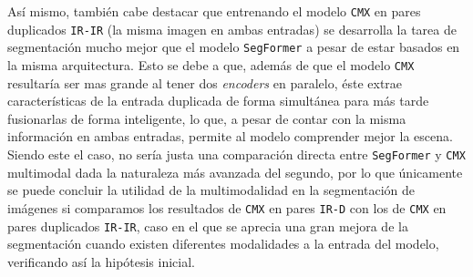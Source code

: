 \documentclass[12pt,a4paper]{report}
\begin{document}
Así mismo, también cabe destacar que entrenando el modelo \texttt{CMX} en pares duplicados \texttt{IR-IR} (la misma imagen en ambas entradas) se desarrolla la tarea de segmentación mucho mejor que el modelo \texttt{SegFormer} a pesar de estar basados en la misma arquitectura. Esto se debe a que, además de que el modelo \texttt{CMX} resultaría ser mas grande al tener dos \textit{encoders} en paralelo, éste extrae características de la entrada duplicada de forma simultánea para más tarde fusionarlas de forma inteligente, lo que, a pesar de contar con la misma información en ambas entradas, permite al modelo comprender mejor la escena. Siendo este el caso, no sería justa una comparación directa entre \texttt{SegFormer} y \texttt{CMX} multimodal dada la naturaleza más avanzada del segundo, por lo que únicamente se puede concluir la utilidad de la multimodalidad en la segmentación de imágenes si comparamos los resultados de \texttt{CMX} en pares \texttt{IR-D} con los de \texttt{CMX} en pares duplicados \texttt{IR-IR}, caso en el que se aprecia una gran mejora de la segmentación cuando existen diferentes modalidades a la entrada del modelo, verificando así la hipótesis inicial.
\end{document}
